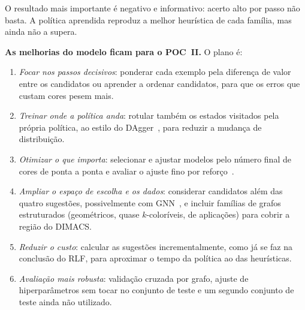 \documentclass[conference,a4paper]{IEEEtran}
\begin{document}
O resultado mais importante é negativo e informativo: acerto alto por passo não basta. A
política aprendida reproduz a melhor heurística de cada família, mas ainda não a supera.

\textbf{As melhorias do modelo ficam para o POC~II.} O plano é:
\begin{enumerate}
\item \emph{Focar nos passos decisivos}: ponderar cada exemplo pela diferença de valor entre os
candidatos ou aprender a ordenar candidatos, para que os erros que custam cores pesem mais.
\item \emph{Treinar onde a política anda}: rotular também os estados visitados pela própria
política, ao estilo do DAgger~\cite{ross2011}, para reduzir a mudança de distribuição.
\item \emph{Otimizar o que importa}: selecionar e ajustar modelos pelo número final de cores de
ponta a ponta e avaliar o ajuste fino por reforço~\cite{khalil2017,watkins2023}.
\item \emph{Ampliar o espaço de escolha e os dados}: considerar candidatos além das quatro
sugestões, possivelmente com GNN~\cite{watkins2023,langedal2024}, e incluir famílias de grafos
estruturados (geométricos, quase $k$-coloríveis, de aplicações) para cobrir a região do
DIMACS.
\item \emph{Reduzir o custo}: calcular as sugestões incrementalmente, como já se faz na
conclusão do RLF, para aproximar o tempo da política ao das heurísticas.
\item \emph{Avaliação mais robusta}: validação cruzada por grafo, ajuste de hiperparâmetros
sem tocar no conjunto de teste e um segundo conjunto de teste ainda não utilizado.
\end{enumerate}





\clearpage
\onecolumn
\appendices
\end{document}

